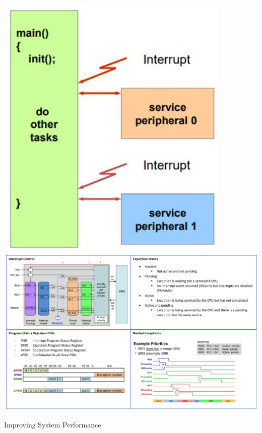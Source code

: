 \documentclass[10pt]{article}
\begin{document}
\begin{itemize}
\includegraphics[max width=\textwidth, center]{2024_12_29_79e6b22f503fb7b4f718g-11(2)}\\
\includegraphics[max width=\textwidth, center]{2024_12_29_79e6b22f503fb7b4f718g-12}
\end{itemize}

Improving System Performance
\end{document}

